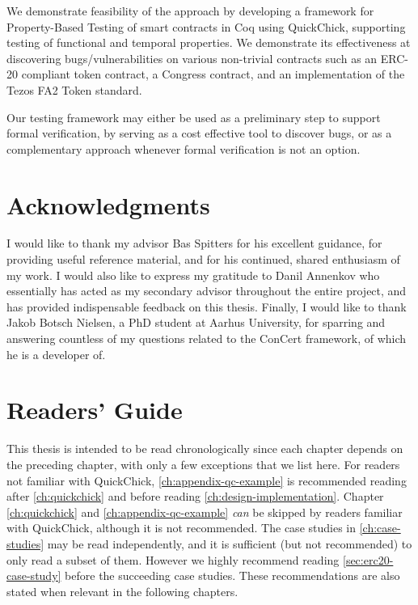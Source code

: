 \documentclass[twoside,11pt,openright]{report}
\begin{document}
We demonstrate feasibility of the approach by developing a framework for Property-Based Testing of smart contracts in Coq using QuickChick, supporting testing of functional and temporal properties. We demonstrate its effectiveness at discovering bugs/vulnerabilities on various non-trivial contracts such as an ERC-20 compliant token contract, a Congress contract, and an implementation of the Tezos FA2 Token standard.

Our testing framework may either be used as a preliminary step to support formal verification, by serving as a cost effective tool to discover bugs, or as a complementary approach whenever formal verification is not an option.



\chapter*{Acknowledgments}
I would like to thank my advisor Bas Spitters for his excellent guidance, for providing useful reference material, and for his continued, shared enthusiasm of my work. I would also like to express my gratitude to Danil Annenkov who essentially has acted as my secondary advisor throughout the entire project, and has provided indispensable feedback on this thesis. Finally, I would like to thank Jakob Botsch Nielsen, a PhD student at Aarhus University, for sparring and answering countless of my questions related to the ConCert framework, of which he is a developer of. 

\chapter*{Readers' Guide}
This thesis is intended to be read chronologically since each chapter depends on the preceding chapter, with only a few exceptions that we list here. For readers not familiar with QuickChick, \autoref{ch:appendix-qc-example} is recommended reading after \autoref{ch:quickchick} and before reading \autoref{ch:design-implementation}. Chapter \ref{ch:quickchick} and \autoref{ch:appendix-qc-example} \textit{can} be skipped by readers familiar with QuickChick, although it is not recommended. The case studies in \autoref{ch:case-studies} may be read independently, and it is sufficient (but not recommended) to only read a subset of them. However we highly recommend reading \autoref{sec:erc20-case-study} before the succeeding case studies. These recommendations are also stated when relevant in the following chapters.
\end{document}
